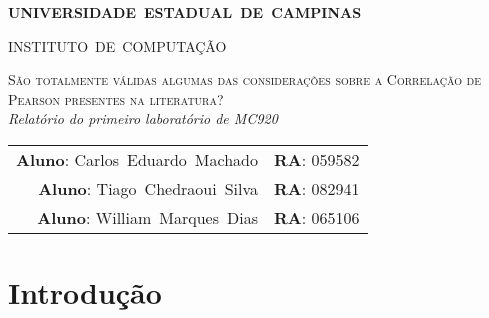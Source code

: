 \documentclass[10pt,a4paper]{article}
\begin{document}
\begin{titlepage}
\thispagestyle{empty}
  \begin{center} {\large \textbf{UNIVERSIDADE~ESTADUAL~DE~CAMPINAS}} \end{center}
  \begin{center} {\large INSTITUTO~DE~COMPUTAÇÃO}                    \end{center}
  \vspace{0.1cm}
  \begin{center}
  \begin{minipage}[tl]{31mm}
  \end{minipage}
  \end{center}
  \vspace{0.3cm}
  \begin{center} 
    {\large \textsc{São totalmente válidas algumas das considerações sobre a
Correlação de Pearson presentes na literatura?  }} 
    \\\vspace{0.5cm}
    {\textsl{Relatório do primeiro laboratório de MC920}}
    \\\vspace{1cm}
    \begin{tabular}{rl}
	  \textbf{Aluno}:   Carlos~Eduardo~Machado &  
	  \textbf{RA}:          059582 \\ 
	  \textbf{Aluno}:        Tiago~Chedraoui~Silva & 
	  \textbf{RA}:        082941 \\
	  \textbf{Aluno}:        William~Marques~Dias & 
	  \textbf{RA}:        065106 \\
	\end{tabular}
  \end{center}
  \vspace{0.5cm}

  \begin{abstract}
O coeficiente de correlação de Pearson é amplamente usado para
comparar imagens, contudo ele apresenta sérias limitações. Esse
trabalho consistiu na validação da análise realizada no Artigo ''The
Ineffectiveness of the Correlation Coefficient for Image Comparisons''.
  \end{abstract}
  \tableofcontents
\end{titlepage} 

\vspace{2mm}
\newpage

\section{Introdução}
\end{document}
